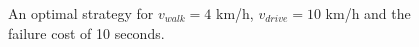 \begin{figure}[tbh]
    \begin{center}
    \hspace{2mm}
    \hspace{2mm}
    \end{center}
    \caption{An optimal strategy for $v_{walk} = 4$ km/h, $v_{drive} = 10$ km/h and the failure cost of 10 seconds.}
    \label{fig:w_4_d_10_w_10_log_12_12}
\end{figure}

